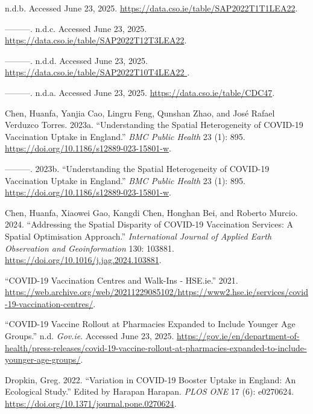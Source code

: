 \documentclass{article}
\newlength{\cslhangindent}
\newenvironment{CSLReferences}[2] %
 {\begin{list}{}{%
  \setlength{\itemindent}{0pt}
  \setlength{\leftmargin}{0pt}
  \setlength{\parsep}{0pt}
  \ifodd #1
   \setlength{\leftmargin}{\cslhangindent}
   \setlength{\itemindent}{-1\cslhangindent}
  \fi
  \setlength{\itemsep}{#2\baselineskip}}}
 {\end{list}}
\begin{document}
\label{refs}
\begin{CSLReferences}{1}{0}
n.d.b. Accessed June 23, 2025.
\url{https://data.cso.ie/table/SAP2022T1T1LEA22}.

---------. n.d.c. Accessed June 23, 2025.
\url{https://data.cso.ie/table/SAP2022T12T3LEA22}.

---------. n.d.d. Accessed June 23, 2025.
\href{https://data.cso.ie/table/SAP2022T10T4LEA22\%20}{https://data.cso.ie/table/SAP2022T10T4LEA22
}.

---------. n.d.a. Accessed June 23, 2025.
\url{https://data.cso.ie/table/CDC47}.

Chen, Huanfa, Yanjia Cao, Lingru Feng, Qunshan Zhao, and José Rafael
Verduzco Torres. 2023a. {``Understanding the Spatial Heterogeneity of
COVID-19 Vaccination Uptake in England.''} \emph{BMC Public Health} 23
(1): 895. \url{https://doi.org/10.1186/s12889-023-15801-w}.

---------. 2023b. {``Understanding the Spatial Heterogeneity of
{COVID}-19 Vaccination Uptake in {England}.''} \emph{BMC Public Health}
23 (1): 895. \url{https://doi.org/10.1186/s12889-023-15801-w}.

Chen, Huanfa, Xiaowei Gao, Kangdi Chen, Honghan Bei, and Roberto Murcio.
2024. {``Addressing the Spatial Disparity of COVID-19 Vaccination
Services: A Spatial Optimisation Approach.''} \emph{International
Journal of Applied Earth Observation and Geoinformation} 130: 103881.
\url{https://doi.org/10.1016/j.jag.2024.103881}.

{``{COVID}-19 Vaccination Centres and Walk-Ins - {HSE}.ie.''} 2021.
\url{https://web.archive.org/web/20211229085102/https://www2.hse.ie/services/covid-19-vaccination-centres/}.

{``{COVID}-19 {Vaccine} Rollout at Pharmacies Expanded to Include
Younger Age Groups.''} n.d. \emph{Gov.ie}. Accessed June 23, 2025.
\url{https://gov.ie/en/department-of-health/press-releases/covid-19-vaccine-rollout-at-pharmacies-expanded-to-include-younger-age-groups/}.

Dropkin, Greg. 2022. {``Variation in {COVID}-19 Booster Uptake in
{England}: {An} Ecological Study.''} Edited by Harapan Harapan.
\emph{PLOS ONE} 17 (6): e0270624.
\url{https://doi.org/10.1371/journal.pone.0270624}.


\end{CSLReferences}
\end{document}
